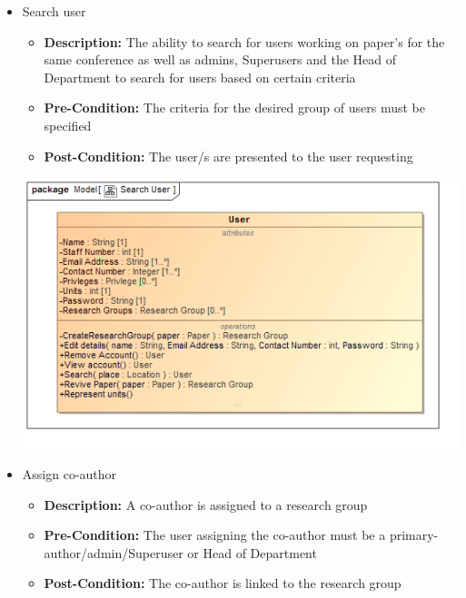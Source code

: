 \documentclass[11pt]{article}
\begin{document}
\begin{itemize}
\begin{center}
		\end{center}
		\item Search user
		\begin{itemize}
			\item \textbf{Description: }The ability to search for users working on paper's for the same conference as well as admins, Superusers and the Head of Department to search for users based on certain criteria
			\item \textbf{Pre-Condition: }The criteria for the desired group of users must be specified
			\item \textbf{Post-Condition: }The user/s are presented to the user requesting
		\end{itemize}
		\begin{center}
			\includegraphics[width=\textwidth]{../DomainModel/SearchUser.png}\\[0.5cm]
		\end{center}
		\item Assign co-author
		\begin{itemize}
			\item \textbf{Description: }A co-author is assigned to a research group
			\item \textbf{Pre-Condition: }The user assigning the co-author must be a primary-author/admin/Superuser or Head of Department
			\item \textbf{Post-Condition: }The co-author is linked to the research group
		\end{itemize}
		\begin{center}

\end{center}
\end{itemize}
\end{document}
